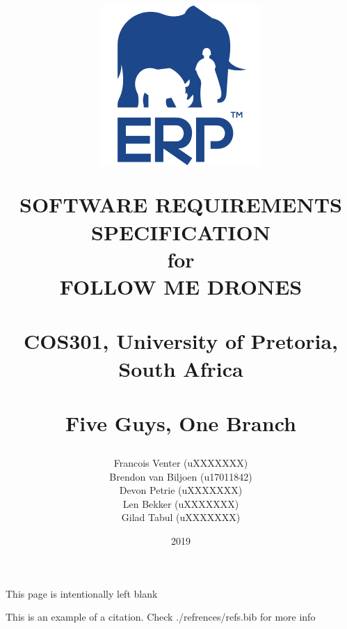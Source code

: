 \documentclass[a4paper,11pt]{book}
\title{
	\begin{figure}[h!]
		\centering
		\includegraphics[scale=0.5]{./assets/images/erp-logo.png}
		\label{fig: erp-logo}
		\caption{}
	\end{figure}
	\vspace{0.5cm}
	\begin{center}
		\Huge{SOFTWARE REQUIREMENTS\\ SPECIFICATION}\\
		for\\
		FOLLOW ME DRONES\\
		~\\
		\LARGE{COS301, University of Pretoria, South Africa}\\
		~\\
		Five Guys, One Branch
	\end{center}
}
\author{
	Francois Venter (uXXXXXXX)\\ 
	Brendon van Biljoen (u17011842)\\ 
	Devon Petrie (uXXXXXXX)\\ 
	Len Bekker (uXXXXXXX)\\ 
	Gilad Tabul (uXXXXXXX)\\
}
\date{2019}
\begin{document}
\frontmatter
\maketitle

\begin{center}
	This page is intentionally left blank
\end{center}
\let\cleardoublepage\clearpage
\tableofcontents



\mainmatter

%







This is an example of a citation. \cite{DUMMY:1} Check ./refrences/refs.bib for more info 


\end{document}
